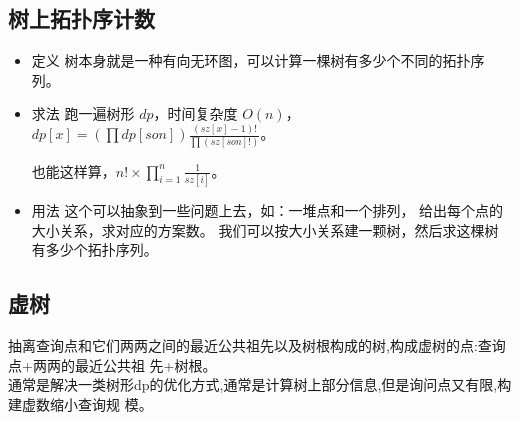 \documentclass[a4paper,12pt]{article}
\begin{document}
\subsection{树上拓扑序计数}

\begin{itemize}
\item 定义
树本身就是一种有向无环图，可以计算一棵树有多少个不同的拓扑序列。
\item 求法
跑一遍树形 $dp$，时间复杂度 $O(n)$，$dp[x]=(\prod dp[son]) \frac{(sz[x]-1)!}{\prod (sz[son]!)}$。

也能这样算，$n! \times \prod_{i=1}^{n} \frac{1}{sz[i]}$。
\item 用法
这个可以抽象到一些问题上去，如：一堆点和一个排列， 给出每个点的大小关系，求对应的方案数。
我们可以按大小关系建一颗树，然后求这棵树有多少个拓扑序列。
\end{itemize}

\subsection{虚树}

\noindent 抽离查询点和它们两两之间的最近公共祖先以及树根构成的树,构成虚树的点:查询点+两两的最近公共祖
先+树根。
\\

\noindent 通常是解决一类树形dp的优化方式,通常是计算树上部分信息,但是询问点又有限,构建虚数缩小查询规
模。
\end{document}
